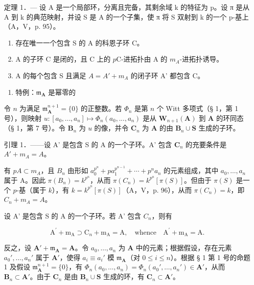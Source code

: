 定理 1．— 设 A 是一个局部环，分离且完备，其剩余域 k 的特征为 p。设 π 是从 A 到 k 的典范映射，并设 S 是 A 的一个子集，使 π 将 S 双射到 k 的一个 p-基上（A，V，p. 95）。

\begin{enumerate}
\def\labelenumi{\alph{enumi})}
\item
  存在唯一一个包含 S 的 A 的科恩子环 C。
\item
  A 的子环 C 是闭的，且 C 上的 \(p\)C-进拓扑由 A 的 \(m_{A}\)-进拓扑诱导。
\item
  A 的每个包含 S 且满足 \(A = A' + m_{A}\) 的闭子环 A' 都包含 C。
\end{enumerate}

\begin{enumerate}
\def\labelenumi{\Alph{enumi})}
\tightlist
\item
  特例：\(\mathfrak{m}_{\mathbf{A}}\) 是幂零的
\end{enumerate}

令 \(n\) 为满足 \(\mathfrak{m}_{\mathbf{A}}^{n+1}=\{0\}\) 的正整数。若 \(\Phi_{n}\) 是第 \(n\) 个 Witt 多项式（§ 1，第 1 号），则映射 \(u:[a_{0},..., a_{n}]\mapsto\Phi_{n}(a_{0},..., a_{n})\) 是从 \(\mathbf{W}_{n+1}(\mathbf{A})\) 到 \(\mathbf{A}\) 的环同态（§ 1，第 7 号）。令 \(\mathbf{B}_{n}\) 为 \(u\) 的像，并令 \(\mathbf{C}_{n}\) 为 \(\mathbf{A}\) 的由 \(\mathbf{B}_{n}\cup\mathbf{S}\) 生成的子环。

引理 1．——设 A' 是包含 S 的 A 的一个子环。A' 包含 \(\mathbf{C}_{n}\) 的充要条件是 \(A' + m_{A} = A\)。

有 \(pA \subset m_A\)，且 \(B_n\) 由形如 \(a_0^{p^n} + pa_1^{p^{n-1}} + \cdots + p^n a_n\) 的元素组成，其中 \(a_0, \ldots, a_n\) 属于 A。因此 \(\pi(B_n) = k^{p^n}\)，从而 \(\pi(C_n) = k^{p^n}[\pi(S)]\)。但由于 \(\pi(S)\) 是一个 \(p\)-基（属于 \(k\)），有 \(k = k^{p^n}[\pi(S)]\)（A，V，p. 96），从而 \(\pi(C_n) = k\)，即 \(C_n + m_A = A\)。

设 A' 是包含 S 的 A 的一个子环。若 A' 包含 \(C_{n}\)，则有

\[
\mathrm{A} ^ {\prime} + \mathrm{m} _ {\mathrm{A}} \supset \mathrm{C} _ {n} + \mathrm{m} _ {\mathrm{A}} = \mathrm{A}, \quad \mathrm{whence} \quad \mathrm{A} ^ {\prime} + \mathrm{m} _ {\mathrm{A}} = \mathrm{A}.
\]

反之，设 \(\mathbf{A}' + \mathfrak{m}_{\mathbf{A}} = \mathbf{A}\)。令 \(a_0, \ldots, a_n\) 为 \(\mathbf{A}\) 中的元素；根据假设，存在元素 \(a_0', \ldots, a_n'\) 属于 \(\mathbf{A}'\)，使得 \(a_i \equiv a_i'\) 模 \(\mathfrak{m}_{\mathbf{A}}\)（对 \(0 \leqslant i \leqslant n\)）。根据 § 1 第 1 号的命题 1 及假设 \(\mathfrak{m}_{\mathbf{A}}^{n+1} = \{0\}\)，有 \(\Phi_n(a_0, \ldots, a_n) = \Phi_n(a_0', \ldots, a_n') \in \mathbf{A}'\)，从而 \(\mathbf{B}_n \subset \mathbf{A}'\)。由于 \(\mathbf{C}_n\) 是由 \(\mathbf{B}_n \cup \mathbf{S}\) 生成的环，有 \(\mathbf{C}_n \subset \mathbf{A}'\)。

